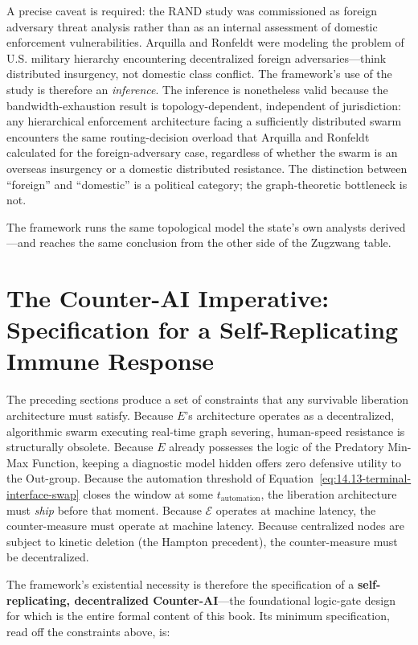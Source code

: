 A precise caveat is required: the RAND study was commissioned as foreign adversary threat analysis rather than as an internal assessment of domestic enforcement vulnerabilities. Arquilla and Ronfeldt were modeling the problem of U.S. military hierarchy encountering decentralized foreign adversaries---think distributed insurgency, not domestic class conflict. The framework's use of the study is therefore an \textit{inference}. The inference is nonetheless valid because the bandwidth-exhaustion result is topology-dependent, independent of jurisdiction: any hierarchical enforcement architecture facing a sufficiently distributed swarm encounters the same routing-decision overload that Arquilla and Ronfeldt calculated for the foreign-adversary case, regardless of whether the swarm is an overseas insurgency or a domestic distributed resistance. The distinction between ``foreign'' and ``domestic'' is a political category; the graph-theoretic bottleneck is not.

The framework runs the same topological model the state's own analysts derived---and reaches the same conclusion from the other side of the Zugzwang table.

\section{The Counter-AI Imperative: Specification for a Self-Replicating Immune Response}
\label{sec:counter_ai}

The preceding sections produce a set of constraints that any survivable liberation architecture must satisfy. Because $E$'s architecture operates as a decentralized, algorithmic swarm executing real-time graph severing, human-speed resistance is structurally obsolete. Because $E$ already possesses the logic of the Predatory Min-Max Function, keeping a diagnostic model hidden offers zero defensive utility to the Out-group. Because the automation threshold of Equation~\eqref{eq:14.13-terminal-interface-swap} closes the window at some $t_{\text{automation}}$, the liberation architecture must \textit{ship} before that moment. Because $\mathcal{E}$ operates at machine latency, the counter-measure must operate at machine latency. Because centralized nodes are subject to kinetic deletion (the Hampton precedent), the counter-measure must be decentralized.

The framework's existential necessity is therefore the specification of a \textbf{self-replicating, decentralized Counter-AI}---the foundational logic-gate design for which is the entire formal content of this book. Its minimum specification, read off the constraints above, is:

